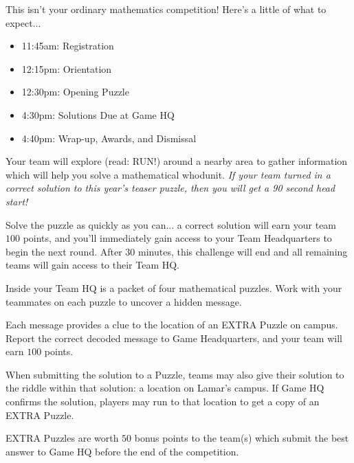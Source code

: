 
\begin{rules}
This isn't your ordinary mathematics competition!
Here's a little of what to expect...


\begin{itemize}
\item 11:45am: Registration
\item 12:15pm: Orientation
\item 12:30pm: Opening Puzzle
\item 4:30pm:  Solutions Due at Game HQ
\item 4:40pm:  Wrap-up, Awards, and Dismissal
\end{itemize}


Your team will explore (read: RUN!) around a nearby area to gather information
which will help you solve a mathematical whodunit.
\textit{If your team turned in a correct solution to this year's teaser
puzzle, then you will get a 90 second head start!}

Solve the puzzle as quickly as you can... a correct solution will earn your
team
\(100\) points, and you'll immediately gain access to your Team Headquarters
to begin the next round. After \(30\) minutes, this challenge will end
and all remaining teams will gain access to their Team HQ.


Inside your Team HQ is a packet of four mathematical puzzles. Work
with your teammates on each puzzle to uncover a hidden message.

Each message provides a clue to the location of an EXTRA Puzzle on campus.
Report the correct
decoded message to Game Headquarters, and your team will earn \(100\) points.


When submitting the solution to a Puzzle, teams may also give their
solution to the riddle within that solution: a location on Lamar's campus.
If Game HQ confirms the solution, players may run to that location to
get a copy of an EXTRA Puzzle.

EXTRA Puzzles are worth \(50\) bonus points to the team(s) which submit the
best answer to Game HQ before the end of the competition.

\newpage


\end{rules}
